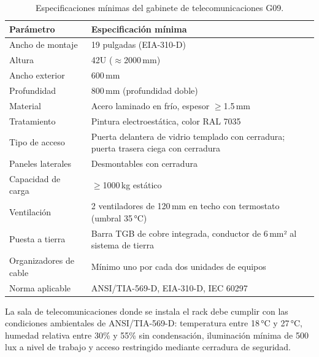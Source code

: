 \begin{table}[H]
    \centering
    \caption{Especificaciones mínimas del gabinete de telecomunicaciones G09.}
    \label{tab:gabinete}
    \begin{tabular}{|p{5cm}|p{8.5cm}|}
        \hline
        \textbf{Parámetro} & \textbf{Especificación mínima} \\
        \hline
        Ancho de montaje      & 19 pulgadas (EIA-310-D) \\
        \hline
        Altura                & 42U ($\approx$2000\,mm) \\
        \hline
        Ancho exterior        & 600\,mm \\
        \hline
        Profundidad           & 800\,mm (profundidad doble) \\
        \hline
        Material              & Acero laminado en frío, espesor $\geq$1.5\,mm \\
        \hline
        Tratamiento           & Pintura electroestática, color RAL 7035 \\
        \hline
        Tipo de acceso        & Puerta delantera de vidrio templado con cerradura;
                                puerta trasera ciega con cerradura \\
        \hline
        Paneles laterales     & Desmontables con cerradura \\
        \hline
        Capacidad de carga    & $\geq$1000\,kg estático \\
        \hline
        Ventilación           & 2 ventiladores de 120\,mm en techo con
                                termostato (umbral 35\,°C) \\
        \hline
        Puesta a tierra       & Barra TGB de cobre integrada, conductor
                                de 6\,mm² al sistema de tierra \\
        \hline
        Organizadores de cable& Mínimo uno por cada dos unidades de equipos \\
        \hline
        Norma aplicable       & ANSI/TIA-569-D, EIA-310-D, IEC 60297 \\
        \hline
    \end{tabular}
\end{table}%
\nobreak\vspace{-0.3cm}
La sala de telecomunicaciones donde se instala el rack debe cumplir con las
condiciones ambientales de \mbox{ANSI/TIA-569-D}: temperatura entre
18\,°C y 27\,°C, humedad relativa entre 30\% y 55\% sin condensación,
iluminación mínima de 500\,lux a nivel de trabajo y acceso restringido
mediante cerradura de seguridad.

